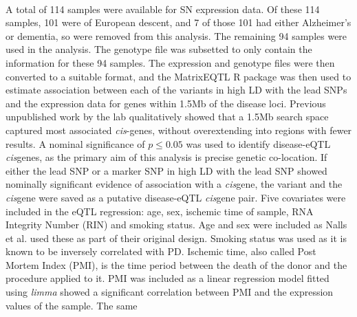 \documentclass{article}
\begin{document}
\\A total of 114 samples were available for SN expression data. Of these 114 samples, 101 were of European descent, and  7 of those 101 had either Alzheimer's or dementia, so were removed from this analysis. The remaining 94 samples were used in the analysis. The genotype file was subsetted to only contain the information for these 94 samples. The expression and genotype files were then converted to a suitable format, and the MatrixEQTL R package\cite{Shabalin2012MatrixOperations.} was then used to estimate association between each of the variants in high LD with the lead SNPs and the expression data for genes within 1.5Mb of the disease loci. Previous unpublished work by the lab qualitatively showed that a 1.5Mb search space captured most associated \textit{cis}-genes, without overextending into regions with fewer results. A nominal significance of $p\leq0.05$ was used to identify disease-eQTL \textit{cis}genes, as the primary aim of this analysis is precise genetic co-location. If either the lead SNP or a marker SNP in high LD with the lead SNP showed nominally significant evidence of association with a \textit{cis}gene, the variant and the \textit{cis}gene were saved as a putative disease-eQTL \textit{cis}gene pair. Five covariates were included in the eQTL regression: age, sex, ischemic time of sample, RNA Integrity Number (RIN) and smoking status. Age and sex were included as Nalls et al.\cite{Nalls2019IdentificationStudies} used these as part of their original design. Smoking status was used as it is known to be inversely correlated with PD\cite{Ben-Shlomo2024TheDisease}. Ischemic time, also called Post Mortem Index (PMI), is the time period between the death of the donor and the procedure applied to it. PMI was included as a linear regression model fitted using \textit{limma}\cite{Ritchie2015LimmaStudies} showed a significant correlation between PMI and the expression values of the sample. The same 
\end{document}
